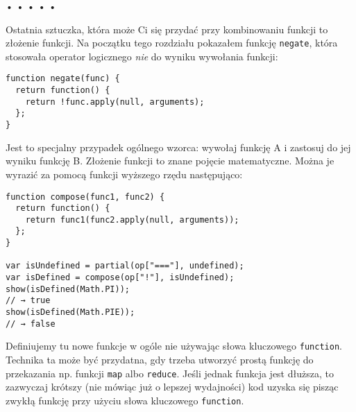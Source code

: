 \begin{center}
• • • • •
\end{center}

  
Ostatnia sztuczka, która może Ci się przydać przy kombinowaniu funkcji to złożenie funkcji. Na początku tego rozdziału pokazałem funkcję \texttt{negate}, która stosowała operator logicznego \emph{nie} do wyniku wywołania funkcji:

  
\begin{verbatim} 
function negate(func) {
  return function() {
    return !func.apply(null, arguments);
  };
}
 \end{verbatim}
  
Jest to specjalny przypadek ogólnego wzorca: wywołaj funkcję A i zastosuj do jej wyniku funkcję B. Złożenie funkcji to znane pojęcie matematyczne. Można je wyrazić za pomocą funkcji wyższego rzędu następująco:

  
\begin{verbatim} 
function compose(func1, func2) {
  return function() {
    return func1(func2.apply(null, arguments));
  };
}

var isUndefined = partial(op["==="], undefined);
var isDefined = compose(op["!"], isUndefined);
show(isDefined(Math.PI));
// → true
show(isDefined(Math.PIE));
// → false
 \end{verbatim}
  
Definiujemy tu nowe funkcje w ogóle nie używając słowa kluczowego \texttt{function}. Technika ta może być przydatna, gdy trzeba utworzyć prostą funkcję do przekazania np. funkcji \texttt{map} albo \texttt{reduce}. Jeśli jednak funkcja jest dłuższa, to zazwyczaj krótszy (nie mówiąc już o lepszej wydajności) kod uzyska się pisząc zwykłą funkcję przy użyciu słowa kluczowego \texttt{function}.